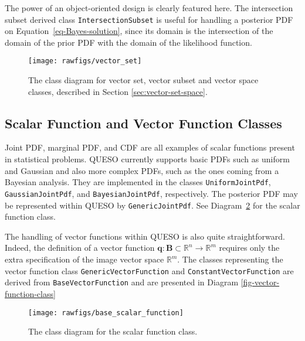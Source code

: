 The power of an object-oriented design is clearly featured here.
The intersection subset derived class \verb+IntersectionSubset+ is useful for handling a posterior PDF  on Equation~\eqref{eq-Bayes-solution},
since its domain is the intersection of the domain of the prior PDF with the domain of the likelihood function.

\begin{figure}[htpb]
\hspace{-1cm}
\texttt{[image: rawfigs/vector\_set]}
\vspace*{-1.5cm}
\caption{The class diagram for vector set, vector subset and vector space classes, described in Section \ref{sec:vector-set-space}.}
\label{fig-vector-space-subset-classes}
\end{figure}

%



\subsection{Scalar Function and Vector Function Classes}\label{sec:scalar-vector-function}

Joint PDF, marginal PDF, and CDF are all examples of scalar functions present in statistical problems.
QUESO currently supports basic PDFs such as uniform and Gaussian and also more complex PDFs, such as the ones coming from a Bayesian analysis. They are implemented in the classes \verb+UniformJointPdf+, \verb+GaussianJointPdf+, and \verb+BayesianJointPdf+, respectively. The posterior PDF may be represented within QUESO by \verb+GenericJointPdf+.
See Diagram~\ref{fig-scalar-function-class} for the scalar function class.

The handling of vector functions within QUESO is also quite straightforward. Indeed, the definition of a vector function $\mathbf{q}:\mathbf{B}\subset\mathbb{R}^n\rightarrow\mathbb{R}^m$ requires only the extra specification of the image vector space $\mathbb{R}^m$. The classes representing the vector function class \verb+GenericVectorFunction+ and \verb+ConstantVectorFunction+ are derived  from \verb+BaseVectorFunction+ and are presented in Diagram \ref{fig-vector-function-class}
\begin{figure}[htpb]
\texttt{[image: rawfigs/base\_scalar\_function]}
\vspace*{-1.5cm}
\caption{The class diagram for the scalar function class.}
\label{fig-scalar-function-class}
\end{figure}

